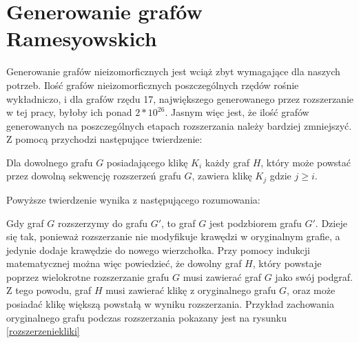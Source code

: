 \section{Generowanie grafów Ramesyowskich}

Generowanie grafów nieizomorficznych jest wciąż zbyt wymagające dla naszych potrzeb. Ilość grafów nieizomorficznych poszczególnych rzędów rośnie wykładniczo, i dla grafów rzędu 17, największego generowanego przez rozszerzanie w tej pracy, byłoby ich ponad $2 * 10^{26}$\cite{OEIS}. Jasnym więc jest, że ilość grafów generowanych na poszczególnych etapach rozszerzania należy bardziej zmniejszyć. Z pomocą przychodzi następujące twierdzenie: 
\begin{theorem}Dla dowolnego grafu $G$ posiadającego klikę $K_i$ każdy graf $H$, który może powstać przez dowolną sekwencję rozszerzeń grafu $G$, zawiera klikę $K_j$ gdzie $j \geq i$.
\end{theorem}
Powyższe twierdzenie wynika z  następującego rozumowania:

 Gdy graf $G$ rozszerzymy do grafu $G'$, to graf $G$ jest podzbiorem grafu $G'$. Dzieje się tak, ponieważ rozszerzanie nie modyfikuje krawędzi w oryginalnym grafie, a jedynie dodaje krawędzie do nowego wierzchołka. Przy pomocy indukcji matematycznej można więc powiedzieć, że dowolny graf $H$, który powstaje poprzez wielokrotne rozszerzanie grafu $G$ musi zawierać graf $G$ jako swój podgraf. Z tego powodu, graf $H$ musi zawierać klikę z oryginalnego grafu $G$, oraz może posiadać klikę większą powstałą w wyniku rozszerzania. Przykład zachowania oryginalnego grafu podczas rozszerzania pokazany jest na rysunku \ref{rozszerzeniekliki}

